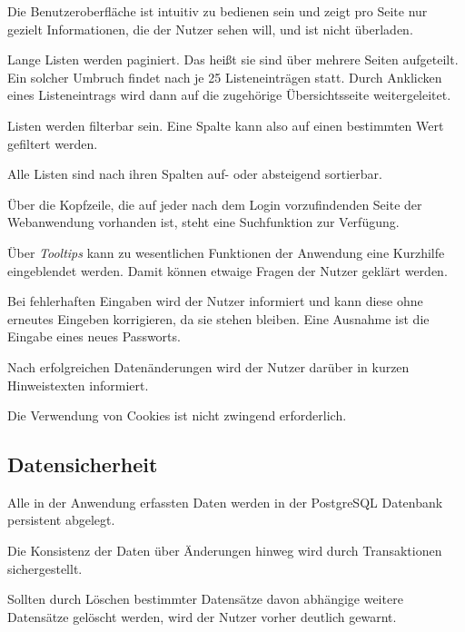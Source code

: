 \begin{description}
	 Die Benutzeroberfläche ist intuitiv zu bedienen sein und zeigt pro Seite nur gezielt Informationen, die der Nutzer sehen will, und ist nicht überladen.

	 Lange Listen werden paginiert. Das heißt sie sind über mehrere Seiten aufgeteilt. Ein solcher Umbruch findet nach je 25 Listeneinträgen statt. Durch Anklicken eines Listeneintrags wird dann auf die zugehörige Übersichtsseite weitergeleitet.

	 Listen werden filterbar sein. Eine Spalte kann also auf einen bestimmten Wert gefiltert werden.

	 Alle Listen sind nach ihren Spalten auf- oder absteigend sortierbar.

	 Über die Kopfzeile, die auf jeder nach dem Login vorzufindenden Seite der Webanwendung
	vorhanden ist, steht eine Suchfunktion zur Verfügung.

	 Über \emph{Tooltips} kann zu wesentlichen Funktionen der Anwendung eine Kurzhilfe eingeblendet werden. Damit können etwaige Fragen der Nutzer geklärt werden.

	 Bei fehlerhaften Eingaben wird der Nutzer informiert und kann diese ohne erneutes Eingeben korrigieren, da sie stehen bleiben. Eine Ausnahme ist die Eingabe eines neues Passworts.

	 Nach erfolgreichen Datenänderungen wird der Nutzer darüber in kurzen Hinweistexten informiert.

	 Die Verwendung von Cookies ist nicht zwingend erforderlich.
\end{description}

\subsection{Datensicherheit}

\begin{description}
	 Alle in der Anwendung erfassten Daten werden in der PostgreSQL Datenbank persistent abgelegt.

	 Die Konsistenz der Daten über Änderungen hinweg wird durch Transaktionen sichergestellt.

	 Sollten durch Löschen bestimmter Datensätze davon abhängige weitere Datensätze gelöscht werden, wird der Nutzer vorher deutlich gewarnt.
\end{description}

